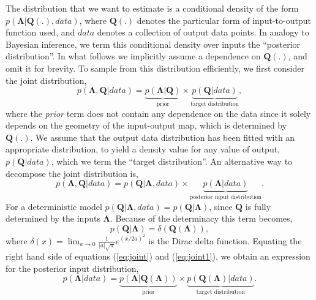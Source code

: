 \documentclass[10pt,letterpaper]{article}
\begin{document}
The distribution that we want to estimate is a conditional density of the form $p(\boldsymbol{\Lambda}|\boldsymbol{Q}(.),data)$, where $\boldsymbol{Q}(.)$ denotes the particular form of input-to-output function used, and $data$ denotes a collection of output data points. In analogy to Bayesian inference, we term this conditional density over inputs the ``posterior distribution''. In what follows we implicitly assume a dependence on $\boldsymbol{Q}(.)$, and omit it for brevity. To sample from this distribution efficiently, we first consider the joint distribution,
%
\begin{equation}\label{eq:joint}
p(\boldsymbol{\Lambda},\boldsymbol{Q}|data) = \underbrace{p(\boldsymbol{\Lambda}|\boldsymbol{Q})}_{\text{prior}} \times \underbrace{p(\boldsymbol{Q}|data)}_{\text{target distribution}},
\end{equation}
%
where the \textit{prior} term does not contain any dependence on the data since it solely depends on the geometry of the input-output map, which is determined by $\boldsymbol{Q}(.)$. We assume that the output data distribution has been fitted with an appropriate distribution, to yield a density value for any value of output, $p(\boldsymbol{Q}|data)$, which we term the ``target distribution''. An alternative way to decompose the joint distribution is,
%
\begin{equation}\label{eq:joint1}
p(\boldsymbol{\Lambda},\boldsymbol{Q}|data) = p(\boldsymbol{Q}|\boldsymbol{\Lambda},data) \times \underbrace{p(\boldsymbol{\Lambda}|data)}_{\text{posterior input distribution}}.
\end{equation}
%
For a deterministic model $p(\boldsymbol{Q}|\boldsymbol{\Lambda},data)=p(\boldsymbol{Q}|\boldsymbol{\Lambda})$, since $\boldsymbol{Q}$ is fully determined by the inputs $\boldsymbol{\Lambda}$. Because of the determinacy this term becomes,
%
\begin{equation}
p(\boldsymbol{Q}|\boldsymbol{\Lambda})=\delta\left(\boldsymbol{Q}(\boldsymbol{\Lambda})\right),
\end{equation}
%
where $\delta(x) = \lim_{a \to 0} \frac{1}{|a|\sqrt{\pi}} e^{(x/2a)^2}$ is the Dirac delta function. Equating the right hand side of equations (\ref{eq:joint}) and (\ref{eq:joint1}), we obtain an expression for the posterior input distribution,
%
\begin{equation}\label{eq:posterior}
p(\boldsymbol{\Lambda}|data) = \underbrace{p(\boldsymbol{\Lambda}|\boldsymbol{Q}(\boldsymbol{\Lambda}))}_{\text{prior}} \times \underbrace{p(\boldsymbol{Q}(\boldsymbol{\Lambda})|data)}_{\text{target distribution}}.
\end{equation}
\end{document}
